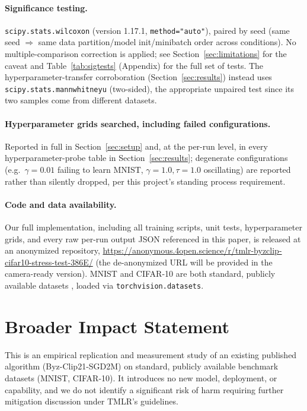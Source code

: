 \documentclass{article}
\begin{document}
\paragraph{Significance testing.} \texttt{scipy.stats.wilcoxon} (version
1.17.1, \texttt{method="auto"}), paired by seed (same seed $\Rightarrow$ same
data partition/model init/minibatch order across conditions). No
multiple-comparison correction is applied; see Section~\ref{sec:limitations}
for the caveat and Table~\ref{tab:sigtests} (Appendix) for the full set of
tests. The hyperparameter-transfer corroboration (Section~\ref{sec:results})
instead uses \texttt{scipy.stats.mannwhitneyu} (two-sided), the appropriate
unpaired test since its two samples come from different datasets.
\paragraph{Hyperparameter grids searched, including failed configurations.}
Reported in full in Section~\ref{sec:setup} and, at the per-run level, in
every hyperparameter-probe table in Section~\ref{sec:results}; degenerate
configurations (e.g.\ $\gamma=0.01$ failing to learn MNIST, $\gamma{=}1.0,
\tau{=}1.0$ oscillating) are reported rather than silently dropped, per this
project's standing process requirement.
\paragraph{Code and data availability.} Our full implementation, including all
training scripts, unit tests, hyperparameter grids, and every raw per-run
output JSON referenced in this paper, is released at an anonymized repository,
\url{https://anonymous.4open.science/r/tmlr-byzclip-cifar10-stress-test-386E/} (the de-anonymized URL will be
provided in the camera-ready version). MNIST and CIFAR-10 are both standard, publicly
available datasets \citep{lecun2010mnist,krizhevsky2009cifar}, loaded via
\texttt{torchvision.datasets}.

\section{Broader Impact Statement}
This is an empirical replication and measurement study of an existing published
algorithm (Byz-Clip21-SGD2M) on standard, publicly available benchmark datasets
(MNIST, CIFAR-10). It introduces no new model, deployment, or capability, and we
do not identify a significant risk of harm requiring further mitigation
discussion under TMLR's guidelines.
\end{document}
